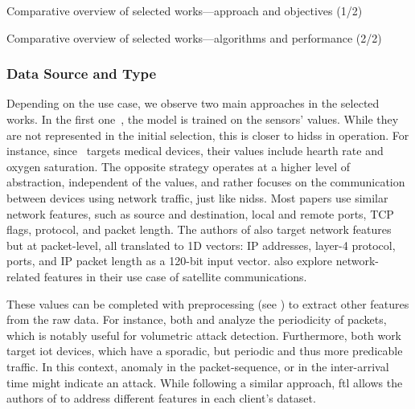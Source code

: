\begin{table}[]
  \centering
  \caption{
    Comparative overview of selected works---approach and objectives (1/2)
    \label{tbl:sota.comp}
  }
  \resizebox{\textwidth}{!}{}
\end{table}

\begin{table}[]
  \centering
  \caption{
    Comparative overview of selected works---algorithms and performance (2/2)
    \label{tbl:selected.perf}
  }
  \resizebox{\textwidth}{!}{}
\end{table}

\subsubsection{Data Source and Type\label{sec:sota.quali.data}}

Depending on the use case, we observe two main approaches in the selected works.
In the first one~\cite{zhang_BlockchainbasedFederatedLearning_2020,schneble_Attackdetectionusing_2019}, the model is trained on the sensors' values.
While they are not represented in the initial selection, this is closer to \glspl{hids} in operation.
For instance, since~\cite{zhang_BlockchainbasedFederatedLearning_2020} targets medical devices, their values include hearth rate and oxygen saturation.
The opposite strategy operates at a higher level of abstraction, independent of the values, and rather focuses on the communication between devices using network traffic, just like \glspl{nids}.
Most papers \cite{chen_Networkanomalydetection_2020,rathore_BlockSecIoTNetBlockchainbaseddecentralized_2019,nguyen_DIoTFederatedSelflearning_2019,li_DeepFedFederatedDeep_2020,rahman_InternetThingsIntrusion_2020,sun_IntrusionDetectionSegmented_2020,popoola_FederatedDeepLearning_2021a,hei_trustedfeatureaggregator_2020} use similar network features, such as source and destination, local and remote ports, TCP flags, protocol, and packet length.
The authors of \cite{qin_LineSpeedScalableIntrusion_2020a} also target network features but at packet-level, all translated to 1D vectors: IP addresses, layer-4 protocol, ports, and IP packet length as a 120-bit input vector.
\textcite{li_DeepFedFederatedDeep_2020} also explore network-related features in their use case of satellite communications.

These values can be completed with preprocessing (see ) to extract other features from the raw data.
For instance, both \textcite{pahl_AllEyesYou_2018} and \textcite{nguyen_DIoTFederatedSelflearning_2019} analyze the periodicity of packets, which is notably useful for volumetric attack detection.
Furthermore, both work target \gls{iot} devices, which have a sporadic, but periodic and thus more predicable traffic.
In this context, anomaly in the packet-sequence, or in the inter-arrival time might indicate an attack.
While following a similar approach, \gls{ftl} allows the authors of \cite{fan_IoTDefenderFederatedTransfer_2020} to address different features in each client's dataset.

